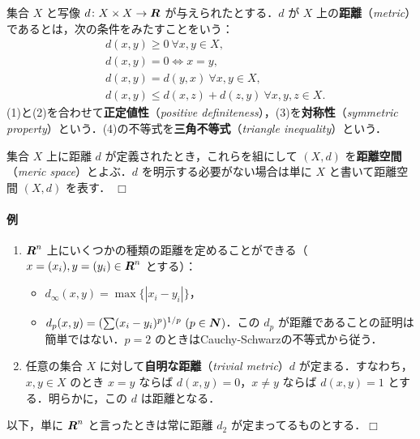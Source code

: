 \documentclass[pandoc,base=10pt,b5j,precisetext]{bxjsarticle}
\providecommand{\tightlist}{%
  \setlength{\itemsep}{0pt}\setlength{\parskip}{0pt}}
\let\oldparagraph\paragraph
\renewcommand{\paragraph}[1]{\oldparagraph{#1}\mbox{}}
\begin{document}
集合 \(X\) と写像 \(d \colon X \times X \to \boldsymbol{R}\)
が与えられたとする．\(d\) が \(X\)
上の\textbf{距離}（\emph{metric}）であるとは，次の条件をみたすことをいう：
\begin{align}
& d(x, y) \ge 0 \ \forall x, y \in X,\\
& d(x, y) = 0 \Longleftrightarrow x = y,\\
& d(x, y) = d(y, x) \ \forall x, y \in X,\\
& d(x, y) \le d(x, z) + d(z, y) \ \forall x, y, z \in X.
\end{align} (1)と(2)を合わせて\textbf{正定値性}（\emph{positive
definiteness}），(3)を\textbf{対称性}（\emph{symmetric
property}）という．(4)の不等式を\textbf{三角不等式}（\emph{triangle
inequality}）という．

集合 \(X\) 上に距離 \(d\) が定義されたとき，これらを組にして \((X, d)\)
を\textbf{距離空間}（\emph{meric space}）とよぶ．\(d\)
を明示する必要がない場合は単に \(X\) と書いて距離空間 \((X, d)\)
を表す． \(\Box\)

\hypertarget{ux4f8b}{%
\paragraph{例}\label{ux4f8b}}

\begin{enumerate}
\def\labelenumi{\roman{enumi})}
\tightlist
\item
  \(\boldsymbol{R}^n\)
  上にいくつかの種類の距離を定めることができる（\(x = (x_i), y = (y_i) \in \boldsymbol{R}^n\)
  とする）：

  \begin{itemize}
  \tightlist
  \item
    \(d_\infty (x, y) = \max \{ | x_i - y_i |\}\)，
  \item
    \(d_p (x, y) = ( \sum (x_i - y_i)^p )^{ 1/p }\ ( p \in \boldsymbol{N})\)．この
    \(d_p\) が距離であることの証明は簡単ではない．\(p = 2\)
    のときはCauchy-Schwarzの不等式から従う．
  \end{itemize}
\item
  任意の集合 \(X\) に対して\textbf{自明な距離}（\emph{trivial
  metric}）\(d\) が定まる．すなわち，\(x , y \in X\) のとき \(x = y\)
  ならば \(d(x, y) = 0\)，\(x \neq y\) ならば \(d(x,y) = 1\)
  とする．明らかに，この \(d\) は距離となる．
\end{enumerate}

以下，単に \(\boldsymbol{R}^n\) と言ったときは常に距離 \(d_2\)
が定まってるものとする．\(\Box\)
\end{document}

